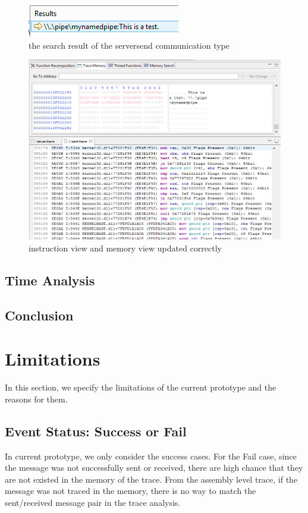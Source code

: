 \documentclass[paper=a4, fontsize=11pt]{scrartcl}
\numberwithin{equation}{section}		%
\numberwithin{figure}{section}			%
\numberwithin{table}{section}				%
\begin{document}
\begin{figure}[H]
\includegraphics{occclientresult}
 \caption{the search result of the serversend communication type}
\label{occclientresult}
\end{figure}

\begin{figure}[H]
\includegraphics[scale=.66]{send}
 \caption{instruction view and memory view updated correctly}
\label{send}
\end{figure}

\subsection{Time Analysis}
\subsection{Conclusion}
\section{Limitations}
In this section, we specify the limitations of the current prototype and the reasons for them. 
\subsection{Event Status: Success or Fail}
In current prototype, we only consider the success cases. For the Fail case, since the message was not successfully sent or received, there are high chance that they are not existed in the memory of the trace. From the assembly level trace, if the message was not traced in the memory, there is no way to match the sent/received message pair in the trace analysis.   
\end{document}
